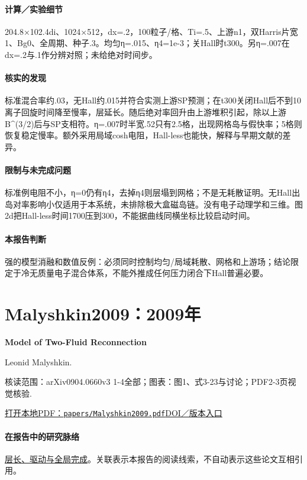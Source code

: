 \documentclass[UTF8,a4paper,11pt,openany,fontset=fandol]{ctexbook}
\begin{document}
\paragraph{计算／实验细节}204.8×102.4di、1024×512，dx=.2，100粒子/格、Ti=.5、上游n1，双Harris片宽1、Bg0、全周期、种子.3。均匀η=.015、η4=1e-3；关Hall时t300。另η=.007在dx=.2与.1作分辨对照；未给绝对时间步。

\paragraph{核实的发现}标准混合率约.03，无Hall约.015并符合实测上游SP预测；在t300关闭Hall后不到10离子回旋时间降至慢率，层延长。随后绝对率回升由上游堆积引起，除以上游B\textasciicircum{}(3/2)后与SP支相符。η=.007时半宽.52只有2.5格，出现网格岛与假快率；5格则恢复稳定慢率。额外采用局域cosh电阻，Hall-less也能快，解释与早期文献的差异。

\paragraph{限制与未完成问题}标准例电阻不小，η=0仍有η4，去掉η4则层塌到网格；不是无耗散证明。无Hall出岛对率影响小仅适用于本系统，未排除极大盒磁岛链。没有电子动理学和三维。图2d把Hall-less时间1700压到300，不能据曲线同横坐标比较启动时间。

\paragraph{本报告判断}强的模型消融和数值反例：必须同时控制均匀/局域耗散、网格和上游场；结论限定于冷无质量电子混合体系，不能外推成任何压力闭合下Hall普遍必要。

\section{Malyshkin2009：2009年}\label{paper:Malyshkin2009}

\textbf{Model of Two-Fluid Reconnection}\citep{Malyshkin2009}\

Leonid Malyshkin.

\textsf{核读范围：}arXiv0904.0660v3 1-4全部；\textsf{图表：}图1、式3-23与讨论；PDF2-3页视觉核验.

\href{run:../papers/Malyshkin2009.pdf}{打开本地PDF：\texttt{papers/Malyshkin2009.pdf}}\quad\href{https://doi.org/10.1103/physrevlett.103.235004}{DOI／版本入口}

\paragraph{在报告中的研究脉络}\hyperref[story:global]{层长、驱动与全局完成}。关联表示本报告的阅读线索，不自动表示这些论文互相引用。
\end{document}
